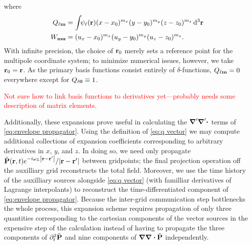 where
\begin{subequations}
  \begin{align}
    Q_{\ell \vb{m}} &= \int_{} \psi_\ell(\vb{r}) (x - x_0)^{m_x} (y - y_0)^{m_y} (z - z_0)^{m_z} \dd[3]{\vb{r}} \label{eq:q vector}\\
    W_{\vb{m}\vb{u}} &= (u_x - x_0)^{m_x} (u_y - y_0)^{m_y} (u_z - z_0)^{m_z} \label{eq:w matrix}.
  \end{align}
\end{subequations}
With infinite precision, the choice of $\vb{r}_0$ merely sets a reference point for the multipole coordinate system; to minimize numerical issues, however, we take $\vb{r}_0 = \vb{r}$.
As the primary basis functions consist entirely of $\delta$-functions, $Q_{\ell\vb{m}} = 0$ everywhere except for $Q_{\ell \vb{0}} \equiv 1$.

\textcolor{red}{Not sure how to link basis functions to derivatives yet---probably needs some description of matrix elements.}

Additionally, these expansions prove useful in calculating the $\grad' \grad' \boldsymbol{\cdot}$ terms of \cref{eq:envelope propagator}.
Using the definition of \cref{eq:q vector} we may compute additional collections of expansion coefficients corresponding to arbitrary derivatives in $x$, $y$, and $z$.
In doing so, we need only propagate $\tilde{\vb{P}}(\vb{r}, t)e^{-i \omega_L \abs{\vb{r} - \vb{r}'}}/\abs{\vb{r} - \vb{r}'}$ between gridpoints; the final projection operation off the auxilliary grid reconstructs the total field.
Moreover, we use the time history of the auxilliary sources alongside \cref{eq:q vector} (with familliar derivatives of Lagrange interpolants) to reconstruct the time-differentiated component of \cref{eq:envelope propagator}.
Because the inter-grid communication step bottlenecks the whole process, this expansion scheme requires propagation of only three quantities corresponding to the cartesian components of the vector sources in the expensive step of the calculation instead of having to propagate the three components of $\partial_t^2 \tilde{\vb{P}}$ and nine components of $\grad \grad \boldsymbol{\cdot} \tilde{\vb{P}}$ independently.

